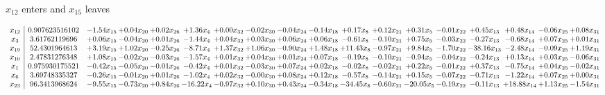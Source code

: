 \documentclass[9pt]{article}
\begin{document}
 $ x_{12} $ enters and $ x_{15} $ leaves 

 \[\begin{array}{c| c c@{\hskip 2pt} c@{\hskip 2pt} c@{\hskip 2pt} c@{\hskip 2pt} c@{\hskip 2pt} c@{\hskip 2pt} c@{\hskip 2pt} c@{\hskip 2pt} c@{\hskip 2pt} c@{\hskip 2pt} c@{\hskip 2pt} c@{\hskip 2pt} c@{\hskip 2pt} c@{\hskip 2pt} c@{\hskip 2pt} c@{\hskip 2pt} }
 x_{12}   &  0.907623516102 & -1.54 x_{15} & +  0.04 x_{20} & +  0.02 x_{26} & +  1.36 x_{4} & +  0.00 x_{32} & -0.02 x_{30} & -0.04 x_{24} & -0.14 x_{18} & +  0.17 x_{8} & +  0.12 x_{21} & +  0.31 x_{5} & -0.01 x_{22} & +  0.45 x_{13} & +  0.48 x_{14} & -0.06 x_{25} & +  0.08 x_{31}\\
 x_{3}   &  3.61762119696 & +  0.06 x_{15} & -0.04 x_{20} & +  0.01 x_{26} & -1.44 x_{4} & +  0.04 x_{32} & +  0.03 x_{30} & +  0.06 x_{24} & +  0.06 x_{18} & -0.61 x_{8} & -0.10 x_{21} & +  0.75 x_{5} & -0.03 x_{22} & -0.27 x_{13} & -0.68 x_{14} & +  0.07 x_{25} & +  0.01 x_{31}\\
 x_{19}   &  52.4301964613 & +  3.19 x_{15} & +  1.02 x_{20} & -0.25 x_{26} & -8.71 x_{4} & +  1.37 x_{32} & +  1.06 x_{30} & -0.90 x_{24} & +  1.48 x_{18} & + 11.43 x_{8} & -0.97 x_{21} & +  9.84 x_{5} & -1.70 x_{22} & -38.16 x_{13} & -2.48 x_{14} & -0.09 x_{25} & +  1.19 x_{31}\\
 x_{10}   &  2.47831276348 & +  1.08 x_{15} & -0.02 x_{20} & -0.03 x_{26} & -1.57 x_{4} & +  0.01 x_{32} & +  0.04 x_{30} & +  0.01 x_{24} & +  0.07 x_{18} & -0.19 x_{8} & -0.10 x_{21} & -0.94 x_{5} & -0.04 x_{22} & -0.24 x_{13} & +  0.13 x_{14} & +  0.03 x_{25} & -0.06 x_{31}\\
 x_{1}   &  0.975930175521 & -0.42 x_{15} & -0.05 x_{20} & -0.01 x_{26} & -0.42 x_{4} & +  0.01 x_{32} & -0.03 x_{30} & +  0.07 x_{24} & +  0.02 x_{18} & -0.02 x_{8} & -0.02 x_{21} & +  0.22 x_{5} & -0.01 x_{22} & +  0.37 x_{13} & -0.75 x_{14} & +  0.04 x_{25} & -0.02 x_{31}\\
 x_{6}   &  3.69748335327 & -0.26 x_{15} & -0.01 x_{20} & +  0.01 x_{26} & -1.02 x_{4} & +  0.02 x_{32} & -0.00 x_{30} & +  0.08 x_{24} & +  0.12 x_{18} & -0.57 x_{8} & -0.14 x_{21} & +  0.15 x_{5} & -0.07 x_{22} & -0.71 x_{13} & -1.22 x_{14} & +  0.07 x_{25} & +  0.00 x_{31}\\
 x_{23}   &  96.3413968624 & -9.55 x_{15} & -0.73 x_{20} & +  0.84 x_{26} & -16.22 x_{4} & -0.97 x_{32} & +  0.10 x_{30} & +  0.43 x_{24} & -0.34 x_{18} & -34.45 x_{8} & -0.60 x_{21} & -20.05 x_{5} & -0.19 x_{22} & -0.11 x_{13} & + 18.88 x_{14} & +  1.13 x_{25} & -1.54 x_{31}\\

\end{array}\]
\end{document}
